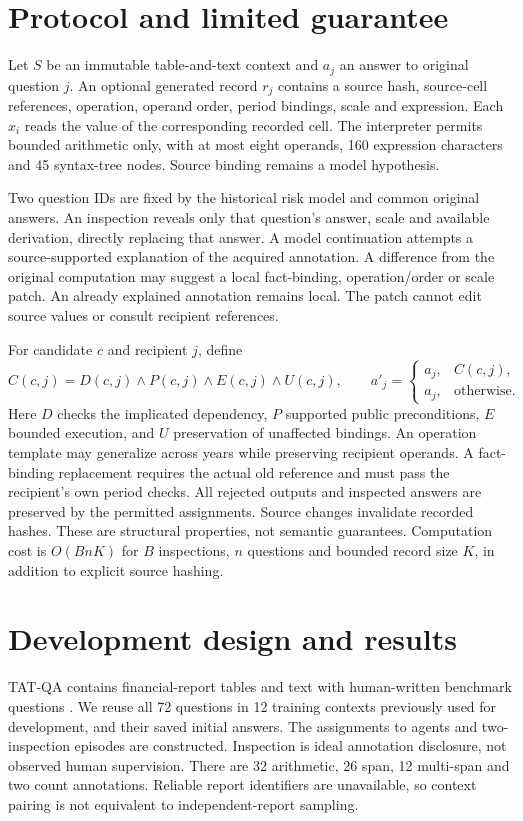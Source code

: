 \documentclass[10pt]{article}
\begin{document}
\section{Protocol and limited guarantee}
Let $S$ be an immutable table-and-text context and $a_j$ an answer to original question $j$. An optional generated record $r_j$ contains a source hash, source-cell references, operation, operand order, period bindings, scale and expression. Each $x_i$ reads the value of the corresponding recorded cell. The interpreter permits bounded arithmetic only, with at most eight operands, 160 expression characters and 45 syntax-tree nodes. Source binding remains a model hypothesis.

Two question IDs are fixed by the historical risk model and common original answers. An inspection reveals only that question's answer, scale and available derivation, directly replacing that answer. A model continuation attempts a source-supported explanation of the acquired annotation. A difference from the original computation may suggest a local fact-binding, operation/order or scale patch. An already explained annotation remains local. The patch cannot edit source values or consult recipient references.

For candidate $c$ and recipient $j$, define
\[
 C(c,j)=D(c,j)\land P(c,j)\land E(c,j)\land U(c,j),\qquad
 a'_j=\begin{cases}\widehat a_j,&C(c,j),\\a_j,&\text{otherwise}.\end{cases}
\]
Here $D$ checks the implicated dependency, $P$ supported public preconditions, $E$ bounded execution, and $U$ preservation of unaffected bindings. An operation template may generalize across years while preserving recipient operands. A fact-binding replacement requires the actual old reference and must pass the recipient's own period checks. All rejected outputs and inspected answers are preserved by the permitted assignments. Source changes invalidate recorded hashes. These are structural properties, not semantic guarantees. Computation cost is $O(BnK)$ for $B$ inspections, $n$ questions and bounded record size $K$, in addition to explicit source hashing.

\section{Development design and results}
TAT-QA contains financial-report tables and text with human-written benchmark questions \cite{tatqa}. We reuse all 72 questions in 12 training contexts previously used for development, and their saved initial answers. The assignments to agents and two-inspection episodes are constructed. Inspection is ideal annotation disclosure, not observed human supervision. There are 32 arithmetic, 26 span, 12 multi-span and two count annotations. Reliable report identifiers are unavailable, so context pairing is not equivalent to independent-report sampling.
\end{document}
